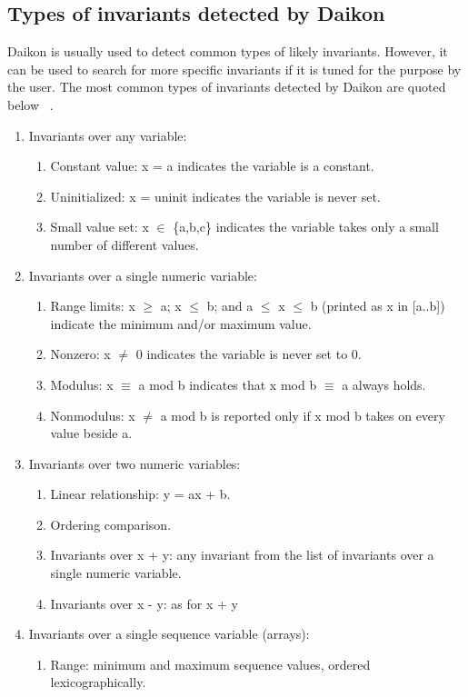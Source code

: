 \subsection{Types of invariants detected by Daikon}
Daikon is usually used to detect common types of likely invariants. However, it can be used to search for more specific invariants if it is tuned for the purpose by the user. The most common types of invariants detected by Daikon are quoted below ~\cite{ernst2001dynamically}. 
\begin{enumerate}
\item Invariants over any variable: 
	\begin{enumerate}
	 \item Constant value: x = a indicates the variable is a constant.
	 \item Uninitialized: x = uninit indicates the variable is never set.
	 \item Small value set: x $\in$ \{a,b,c\} indicates the variable takes only a small number of different values.
	\end{enumerate}
\item Invariants over a single numeric variable: 
	\begin{enumerate}
	\item Range limits: x $\ge$ a; x $\le$ b; and a $\le$ x $\le$ b (printed as x in [a..b]) indicate the minimum and/or maximum value.
	\item Nonzero: x $\ne$ 0 indicates the variable is never set to 0. 
	\item Modulus: x $\equiv$ a mod b indicates that x mod b $\equiv$ a always holds.
	\item Nonmodulus: x $\ne$ a mod b is reported only if x mod b takes on every value beside a.
	\end{enumerate}
\item Invariants over two numeric variables: 
	\begin{enumerate}
	\item Linear relationship: y = ax + b. 
	\item Ordering comparison. 
	\item Invariants over x + y: any invariant from the list of invariants over a single numeric variable.
	\item Invariants over x - y: as for x + y
	\end{enumerate}
\item Invariants over a single sequence variable (arrays): 
	\begin{enumerate}
	\item Range: minimum and maximum sequence values, ordered lexicographically. 

\end{enumerate}
\end{enumerate}
